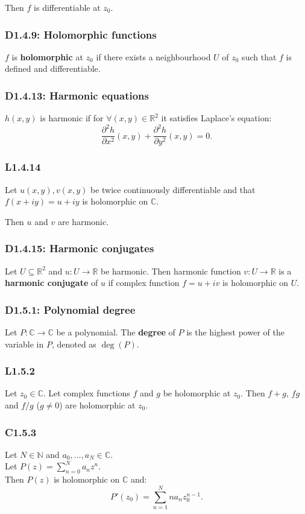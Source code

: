\documentclass{article}
\begin{document}
\begin{multicols*}{3}
Then $f$ is differentiable at $z_0$.

\subsubsection*{D1.4.9: Holomorphic functions}
$f$ is \textbf{holomorphic} at $z_0$ if there exists a neighbourhood
$U$ of $z_0$ such that $f$ is defined and differentiable.

\subsubsection*{D1.4.13: Harmonic equations}
$h(x,y)$ is harmonic if for
$\forall(x,y)\in\mathbb{R}^2$ it satisfies Laplace's equation:
$$\frac{\partial^2h}{\partial x^2}(x,y)+
\frac{\partial^2h}{\partial y^2}(x,y)=0.$$

\subsubsection*{L1.4.14}
Let $u(x,y),v(x,y)$ be twice continuously differentiable
and that $f(x+iy)=u+iy$ is holomorphic on $\mathbb{C}$.

Then $u$ and $v$ are harmonic.

\subsubsection*{D1.4.15: Harmonic conjugates}
Let $U\subseteq\mathbb{R}^2$ and
$u:U\rightarrow\mathbb{R}$ be harmonic.
Then harmonic function $v:U\rightarrow\mathbb{R}$ is a
\textbf{harmonic conjugate} of $u$ if complex function
$f=u+iv$ is holomorphic on $U$.

\subsubsection*{D1.5.1: Polynomial degree}
Let $P:\mathbb{C}\rightarrow\mathbb{C}$ be a polynomial.
The \textbf{degree} of $P$ 
is the highest power of the variable in $P$,
denoted as $\deg(P)$.

\subsubsection*{L1.5.2}
Let $z_0\in\mathbb{C}$. Let complex functions $f$ and $g$ be
holomorphic at $z_0$. Then $f+g$, $fg$ and $f/g$ ($g\neq0$)
are holomorphic at $z_0$.

\subsubsection*{C1.5.3}
Let $N\in\mathbb{N}$ and $a_0,\dots,a_N\in\mathbb{C}$. \\
Let $\displaystyle P(z)=\sum_{n=0}^{N}a_n z^n$. \\
Then $P(z)$ is holomorphic on $\mathbb{C}$ and:
$$P'(z_0)=\sum_{n=1}^{N}na_n z_0^{n-1}.$$


\end{multicols*}
\end{document}
